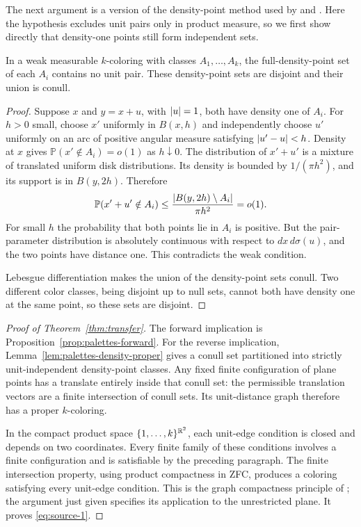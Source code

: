 The next argument is a version of the density-point method used by
\citet{Falconer1981} and \citet[Lemma~1 and Proposition~1]{Payne2009}.
Here the hypothesis excludes unit pairs only in product measure, so we
first show directly that density-one points still form independent sets.

\begin{lemma}\label{lem:palettes-density-proper}
In a weak measurable \(k\)-coloring with classes \(A_1,\ldots,A_k\),
the full-density-point set of each \(A_i\) contains no unit pair.
These density-point sets are disjoint and their union is conull.
\end{lemma}

\begin{proof}
Suppose \(x\) and \(y=x+u\), with \(\lvert u\rvert=1\), both have density one
of \(A_i\).  For \(h>0\) small, choose \(x'\) uniformly in \(B(x,h)\)
and independently choose \(u'\) uniformly on an arc of positive
angular measure satisfying \(\lvert u'-u\rvert<h\).
Density at \(x\) gives
\(\mathbb P(x'\notin A_i)=o(1)\) as \(h\downarrow0\).
The distribution of \(x'+u'\) is a mixture of translated uniform
disk distributions.  Its density is bounded by \(1/(\pi h^2)\),
and its support is in \(B(y,2h)\).  Therefore
\[
 \mathbb P(x'+u'\notin A_i)
 \le \frac{\lvert B(y,2h)\setminus A_i\rvert}{\pi h^2}=o(1).
\]
For small \(h\) the probability that both points lie in \(A_i\)
is positive.  But the pair-parameter distribution is absolutely
continuous with respect to \(dx\,d\sigma(u)\), and the two points
have distance one.  This contradicts the weak condition.

Lebesgue differentiation makes the union of the density-point sets
conull.  Two different color classes, being disjoint up to null sets,
cannot both have density one at the same point, so these sets are
disjoint.
\end{proof}

\begin{proof}[Proof of Theorem~\ref{thm:transfer}]
The forward implication is Proposition~\ref{prop:palettes-forward}.
For the reverse implication, Lemma~\ref{lem:palettes-density-proper}
gives a conull set partitioned into strictly unit-independent
density-point classes.  Any fixed finite configuration of plane
points has a translate entirely inside that conull set: the permissible
translation vectors are a finite intersection of conull sets.
Its unit-distance graph therefore has a proper \(k\)-coloring.

In the compact product space \(\{1,\ldots,k\}^{\mathbb R^2}\), each unit-edge
condition is closed and depends on two coordinates.  Every finite
family of these conditions involves a finite configuration and
is satisfiable by the preceding paragraph.  The finite intersection
property, using product compactness in ZFC, produces a coloring
satisfying every unit-edge condition.  This is the graph compactness
principle of \cite[Theorem 1]{deBruijnErdos1951}; the argument just
given specifies its application to the unrestricted plane.
It proves \eqref{eq:source-1}.
\end{proof}


